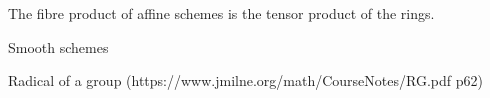 %

\begin{lemma}
  \label{a}
  The fibre product of affine schemes is the tensor product of the rings.
\end{lemma}

\begin{definition}
  \label{smoothscheme}
  Smooth schemes
\end{definition}

\begin{definition}
  \label{radical}
  Radical of a group (https://www.jmilne.org/math/CourseNotes/RG.pdf p62)
\end{definition}
